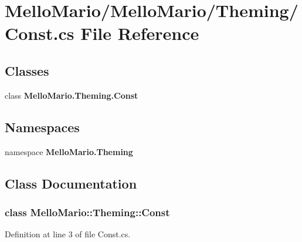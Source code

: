 \section{Mello\+Mario/\+Mello\+Mario/\+Theming/\+Const.cs File Reference}
\label{Const_8cs}
\subsection*{Classes}
\begin{DoxyCompactItemize}
\item 
class \textbf{ Mello\+Mario.\+Theming.\+Const}
\end{DoxyCompactItemize}
\subsection*{Namespaces}
\begin{DoxyCompactItemize}
\item 
namespace \textbf{ Mello\+Mario.\+Theming}
\end{DoxyCompactItemize}


\subsection{Class Documentation}
\label{classMelloMario_1_1Theming_1_1Const}
\subsubsection{class Mello\+Mario\+:\+:Theming\+:\+:Const}


Definition at line 3 of file Const.\+cs.




